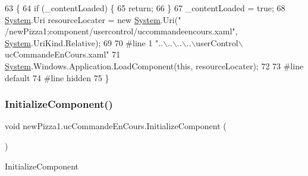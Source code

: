 \begin{DoxyCode}
63                                           \{
64             \textcolor{keywordflow}{if} (\_contentLoaded) \{
65                 \textcolor{keywordflow}{return};
66             \}
67             \_contentLoaded = \textcolor{keyword}{true};
68             \hyperlink{namespaceSystem}{System}.Uri resourceLocater = \textcolor{keyword}{new} \hyperlink{namespaceSystem}{System}.Uri(\textcolor{stringliteral}{"
      /newPizza1;component/usercontrol/uccommandeencours.xaml"}, \hyperlink{namespaceSystem}{System}.UriKind.Relative);
69             
70 \textcolor{preprocessor}{            #line 1 "..\(\backslash\)..\(\backslash\)..\(\backslash\)..\(\backslash\)userControl\(\backslash\)ucCommandeEnCours.xaml"
}
71             \hyperlink{namespaceSystem}{System}.Windows.Application.LoadComponent(\textcolor{keyword}{this}, resourceLocater);
72             
73 \textcolor{preprocessor}{            #line default
}
74 \textcolor{preprocessor}{            #line hidden
}
75         \}
\end{DoxyCode}
\mbox{\label{classnewPizza1_1_1ucCommandeEnCours_a5838b3aa1f180eda285120814af5dadd}} 
\subsubsection{\texorpdfstring{Initialize\+Component()}{InitializeComponent()}\hspace{0.1cm}{\footnotesize\ttfamily [4/6]}}
{\footnotesize\ttfamily void new\+Pizza1.\+uc\+Commande\+En\+Cours.\+Initialize\+Component (\begin{DoxyParamCaption}{ }\end{DoxyParamCaption})\hspace{0.3cm}{\ttfamily [inline]}}



Initialize\+Component 


